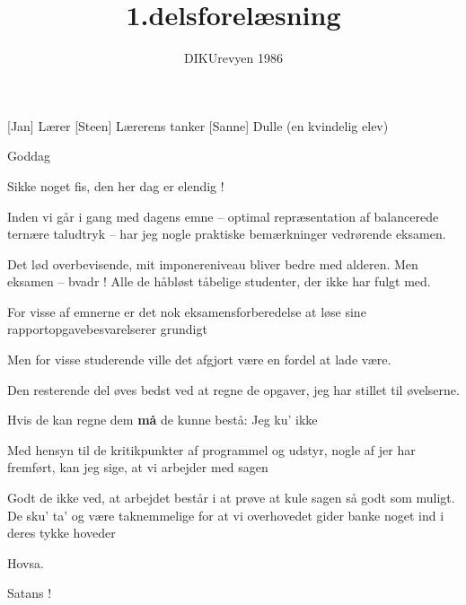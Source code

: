 \documentclass[a4paper,11pt]{article}
\title{1.delsforelæsning}
\author{DIKUrevyen 1986}
\begin{document}
\maketitle

\begin{roles}
[Jan] Lærer
[Steen] Lærerens tanker
[Sanne] Dulle (en kvindelig elev)
\end{roles}

\begin{sketch}


 Goddag

 Sikke noget fis, den her dag er elendig !

 Inden vi går i gang med dagens emne -- optimal repræsentation af
balancerede ternære taludtryk -- har jeg nogle praktiske bemærkninger vedrørende
eksamen.

 Det lød overbevisende, mit imponereniveau bliver bedre med alderen.
Men eksamen -- bvadr !  Alle de håbløst tåbelige studenter, der ikke har fulgt
med.

 For visse af emnerne er det nok eksamensforberedelse at løse sine
rapportopgavebesvarelserer grundigt

 Men for visse studerende ville det afgjort være en fordel at lade være.

 Den resterende del øves bedst ved at regne de opgaver, jeg har stillet
til øvelserne.

 Hvis de kan regne dem \textbf{må} de kunne bestå: Jeg ku' ikke

 Med hensyn til de kritikpunkter af programmel og udstyr, nogle af jer
har fremført, kan jeg sige, at vi arbejder med sagen

 Godt de ikke ved, at arbejdet består i at prøve at kule sagen så godt
som muligt.  De sku' ta' og være taknemmelige for at vi overhovedet gider banke
noget ind i deres tykke hoveder 

 Hovsa.

 Satans ! 


\end{sketch}
\end{document}
